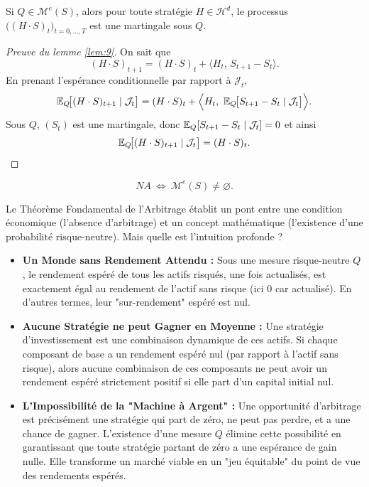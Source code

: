 \begin{lemme}\label{lem:9}
Si $Q\in\mathcal{M}^e(S)$, alors pour toute stratégie $H\in\mathcal{H}^d$,
le processus $\big((H\cdot S)_t\big)_{t=0,\dots,T}$ est une martingale sous $Q$.
\end{lemme}

\begin{proof}[Preuve du lemme \ref{lem:9}]
On sait que
\[
(H\cdot S)_{t+1}=(H\cdot S)_t+\big\langle H_t,\,S_{t+1}-S_t\big\rangle .
\]
En prenant l'espérance conditionnelle par rapport à $\mathcal{J}_t$,
\[
\E_Q\!\big[(H\cdot S)_{t+1}\mid\mathcal{J}_t\big]
=(H\cdot S)_t+\Big\langle H_t,\ \E_Q\!\big[S_{t+1}-S_t\mid\mathcal{J}_t\big]\Big\rangle .
\]
Sous $Q$, $(S_t)$ est une martingale, donc $\mathbb{E}_Q[S_{t+1}-S_t\mid\mathcal{J}_t]=0$ et ainsi
\[
\mathbb{E}_Q\!\big[(H\cdot S)_{t+1}\mid\mathcal{J}_t\big]=(H\cdot S)_t .
\]
\end{proof}

\begin{theoreme}
\begin{equation}
NA\ \Longleftrightarrow\ \mathcal{M}^e(S)\neq\varnothing .
\end{equation}
\end{theoreme}

\begin{tcolorbox}[title=Intuition : Le Sens Économique du FTAP, colback=blue!5!white, colframe=blue!50!black]
Le Théorème Fondamental de l'Arbitrage établit un pont entre une condition économique (l'absence d'arbitrage) et un concept mathématique (l'existence d'une probabilité risque-neutre). Mais quelle est l'intuition profonde ?

\begin{itemize}
    \item \textbf{Un Monde sans Rendement Attendu :} Sous une mesure risque-neutre $Q$, le rendement espéré de tous les actifs risqués, une fois actualisés, est exactement égal au rendement de l'actif sans risque (ici 0 car actualisé). En d'autres termes, leur "sur-rendement" espéré est nul.
    \item \textbf{Aucune Stratégie ne peut Gagner en Moyenne :} Une stratégie d'investissement est une combinaison dynamique de ces actifs. Si chaque composant de base a un rendement espéré nul (par rapport à l'actif sans risque), alors aucune combinaison de ces composants ne peut avoir un rendement espéré strictement positif si elle part d'un capital initial nul.
    \item \textbf{L'Impossibilité de la "Machine à Argent" :} Une opportunité d'arbitrage est précisément une stratégie qui part de zéro, ne peut pas perdre, et a une chance de gagner. L'existence d'une mesure $Q$ élimine cette possibilité en garantissant que toute stratégie partant de zéro a une espérance de gain nulle. Elle transforme un marché viable en un "jeu équitable" du point de vue des rendements espérés.
\end{itemize}
\end{tcolorbox}

